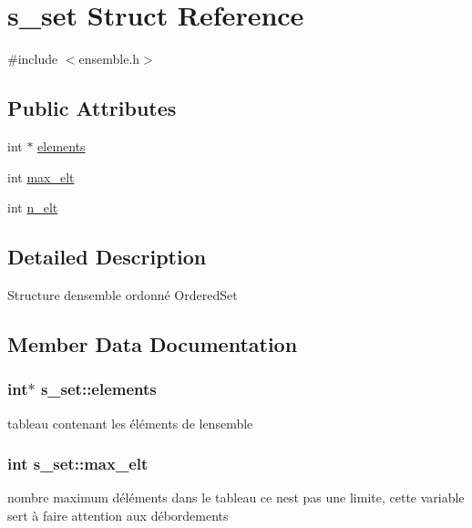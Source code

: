 \hypertarget{structs__set}{}\section{s\+\_\+set Struct Reference}
\label{structs__set}


{\ttfamily \#include $<$ensemble.\+h$>$}

\subsection*{Public Attributes}
\begin{DoxyCompactItemize}
\item 
int $\ast$ \hyperlink{structs__set_a11885c553f5034a229f33209eeeb3932}{elements}
\item 
int \hyperlink{structs__set_a85a5c45205e8f8ac61d32d28ecac4e20}{max\+\_\+elt}
\item 
int \hyperlink{structs__set_ac5d24903f7f143cd44e352c622837c64}{n\+\_\+elt}
\end{DoxyCompactItemize}


\subsection{Detailed Description}
Structure d\textquotesingle{}ensemble ordonné Ordered\+Set 

\subsection{Member Data Documentation}
\subsubsection[{\texorpdfstring{elements}{elements}}]{\setlength{\rightskip}{0pt plus 5cm}int$\ast$ s\+\_\+set\+::elements}\hypertarget{structs__set_a11885c553f5034a229f33209eeeb3932}{}\label{structs__set_a11885c553f5034a229f33209eeeb3932}
tableau contenant les éléments de l\textquotesingle{}ensemble 
\subsubsection[{\texorpdfstring{max\+\_\+elt}{max_elt}}]{\setlength{\rightskip}{0pt plus 5cm}int s\+\_\+set\+::max\+\_\+elt}\hypertarget{structs__set_a85a5c45205e8f8ac61d32d28ecac4e20}{}\label{structs__set_a85a5c45205e8f8ac61d32d28ecac4e20}
nombre maximum d\textquotesingle{}éléments dans le tableau ce n\textquotesingle{}est pas une limite, cette variable sert à faire attention aux débordements 
